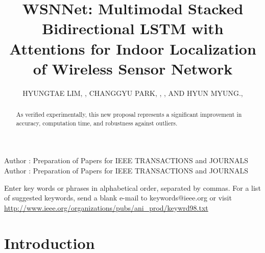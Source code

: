 \documentclass{ieeeaccess}
\begin{document}

\title{WSNNet: Multimodal Stacked Bidirectional LSTM with Attentions for Indoor Localization of Wireless Sensor Network}
\author{\uppercase{HYUNGTAE LIM}, ,
	\uppercase{CHANGGYU PARK}, ,
	\uppercase{, and Hyun Myung}.,
	}
\address[1]{Urban Robotics Laboratory, Korea Advanced Institute of Science and Technology, Daejeon 34141, South Korea.}


\markboth
{Author \headeretal: Preparation of Papers for IEEE TRANSACTIONS and JOURNALS}
{Author \headeretal: Preparation of Papers for IEEE TRANSACTIONS and JOURNALS}


\begin{abstract}
	

As verified experimentally, this new proposal represents a significant improvement in accuracy, computation time, and robustness against outliers.

\end{abstract}



\begin{keywords}
Enter key words or phrases in alphabetical 
order, separated by commas. For a list of suggested keywords, send a blank 
e-mail to keywords@ieee.org or visit \underline
{http://www.ieee.org/organizations/pubs/ani\_prod/keywrd98.txt}
\end{keywords}

\titlepgskip=-15pt

\maketitle

\section{Introduction}
\label{sec:introduction}
\end{document}
